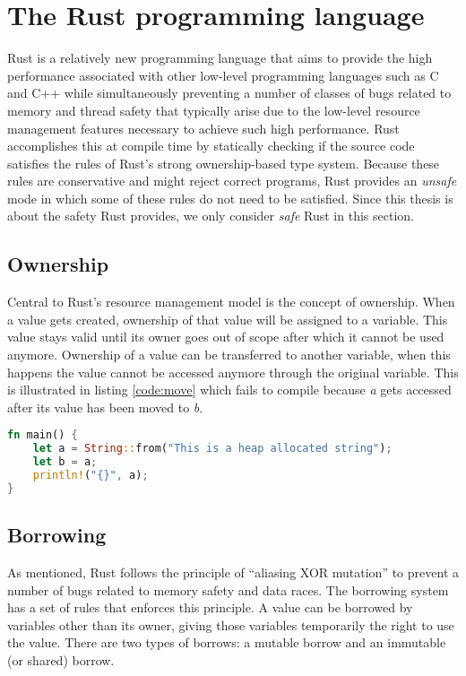 \section{The Rust programming language}
\label{sec:rustbackground}
Rust is a relatively new programming language that aims to provide the high performance associated with other low-level programming languages such as C and C++ while simultaneously preventing a number of classes of bugs related to memory and thread safety that typically arise due to the low-level resource management features necessary to achieve such high performance.
Rust accomplishes this at compile time by statically checking if the source code satisfies the rules of Rust's strong ownership-based type system.
Because these rules are conservative and might reject correct programs, Rust provides an \textit{unsafe} mode in which some of these rules do not need to be satisfied.
Since this thesis is about the safety Rust provides, we only consider \textit{safe} Rust in this section.

\subsection{Ownership}
Central to Rust's resource management model is the concept of ownership.
When a value gets created, ownership of that value will be assigned to a variable.
This value stays valid until its owner goes out of scope after which it cannot be used anymore.
Ownership of a value can be transferred to another variable, when this happens the value cannot be accessed anymore through the original variable.
This is illustrated in listing \ref{code:move} which fails to compile because \textit{a} gets accessed after its value has been moved to \textit{b}.
\begin{lstlisting}[language=Rust,frame=single,caption=Moving a variable,label=code:move]
fn main() {
    let a = String::from("This is a heap allocated string");
    let b = a;
    println!("{}", a);
}
\end{lstlisting}

\subsection{Borrowing}
\label{subsec:borrowing}
As mentioned, Rust follows the principle of ``aliasing XOR mutation'' to prevent a number of bugs related to memory safety and data races.
The borrowing system has a set of rules that enforces this principle.
A value can be borrowed by variables other than its owner, giving those variables temporarily the right to use the value.
There are two types of borrows: a mutable borrow and an immutable (or shared) borrow. 

